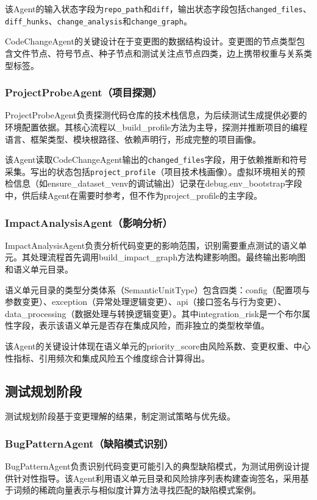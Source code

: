 该Agent的输入状态字段为\texttt{repo\_path}和\allowbreak\texttt{diff}，输出状态字段包括\texttt{changed\_files}、\allowbreak\texttt{diff\_hunks}、\allowbreak\texttt{change\_analysis}和\allowbreak\texttt{change\_graph}。

CodeChangeAgent的关键设计在于变更图的数据结构设计。变更图的节点类型包含文件节点、符号节点、种子节点和测试关注点节点四类，边上携带权重与关系类型标签。
\subsubsection{ProjectProbeAgent（项目探测）}
ProjectProbeAgent负责探测代码仓库的技术栈信息，为后续测试生成提供必要的环境配置依据。其核心流程以\_build\_profile方法为主导，探测并推断项目的编程语言、框架类型、模块根路径、依赖声明行，形成完整的项目画像。

该Agent读取CodeChangeAgent输出的\texttt{changed\_files}字段，用于依赖推断和符号采集。写出的状态包括\texttt{project\_profile}（项目技术栈画像）。虚拟环境相关的预检信息（如ensure\_dataset\_venv的调试输出）记录在debug.env\_bootstrap字段中，供后续Agent在需要时参考，但不作为project\_profile的主字段。
\subsubsection{ImpactAnalysisAgent（影响分析）}
ImpactAnalysisAgent负责分析代码变更的影响范围，识别需要重点测试的语义单元。其处理流程首先调用build\_impact\_graph方法构建影响图。最终输出影响图和语义单元目录。

语义单元目录的类型分类体系（SemanticUnitType）包含四类：config（配置项与参数变更）、exception（异常处理逻辑变更）、api（接口签名与行为变更）、data\_processing（数据处理与转换逻辑变更）。其中integration\_risk是一个布尔属性字段，表示该语义单元是否存在集成风险，而非独立的类型枚举值。

该Agent的关键设计体现在语义单元的priority\_score由风险系数、变更权重、中心性指标、引用频次和集成风险五个维度综合计算得出。
\subsection{测试规划阶段}
测试规划阶段基于变更理解的结果，制定测试策略与优先级。
\subsubsection{BugPatternAgent（缺陷模式识别）}
BugPatternAgent负责识别代码变更可能引入的典型缺陷模式，为测试用例设计提供针对性指导。该Agent利用语义单元目录和风险排序列表构建查询签名，采用基于词频的稀疏向量表示与相似度计算方法寻找匹配的缺陷模式案例。

